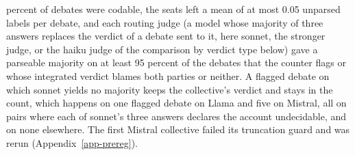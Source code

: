 percent of debates were codable, the seats left a mean of at most 0.05
unparsed labels per debate, and each routing judge (a model whose majority
of three answers replaces the verdict of a debate sent to it, here sonnet,
the stronger judge, or the haiku judge of the comparison by verdict type
below) gave a parseable majority on
at least 95 percent of the debates that the counter flags or whose integrated
verdict blames both parties or neither. A flagged debate on which sonnet
yields no majority keeps the collective's verdict and stays in the count,
which happens on one flagged debate on Llama and five on Mistral, all on
pairs where each of sonnet's three answers declares the account undecidable,
and on none elsewhere. The first
Mistral collective failed its truncation guard and was rerun
(Appendix~\ref{app-prereg}).

